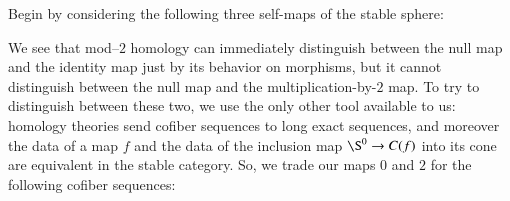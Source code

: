 Begin by considering the following three self-maps of the stable sphere:
\begin{center}
\end{center}
We see that mod--$2$ homology can immediately distinguish between the null map and the identity map just by its behavior on morphisms, but it cannot distinguish between the null map and the multiplication-by-$2$ map.  To try to distinguish between these two, we use the only other tool available to us: homology theories send cofiber sequences to long exact sequences, and moreover the data of a map $f$ and the data of the inclusion map $\S^0 \to C(f)$ into its cone are equivalent in the stable category.  So, we trade our maps $0$ and $2$ for the following cofiber sequences:
